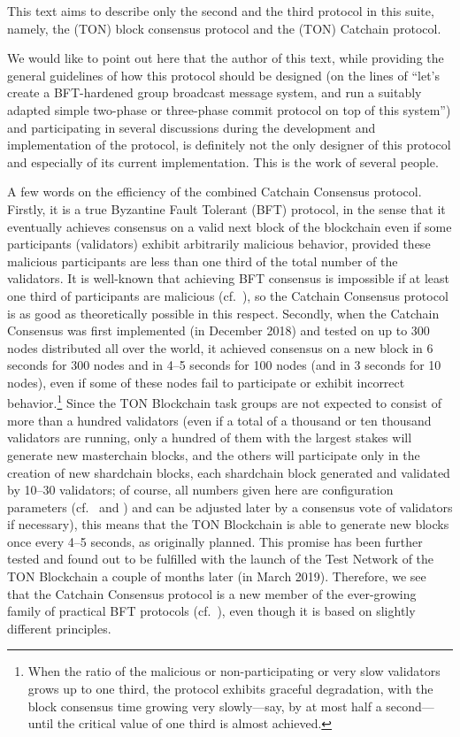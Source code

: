 \documentclass[12pt,oneside]{article}
\begin{document}
This text aims to describe only the second and the third protocol in this suite, namely, the (TON) block consensus protocol and the (TON) Catchain protocol.

We would like to point out here that the author of this text, while providing the general guidelines of how this protocol should be designed (on the lines of ``let's create a BFT-hardened group broadcast message system, and run a suitably adapted simple two-phase or three-phase commit protocol on top of this system'') and participating in several discussions during the development and implementation of the protocol, is definitely not the only designer of this protocol and especially of its current implementation. This is the work of several people.

A few words on the efficiency of the combined Catchain Consensus protocol. Firstly, it is a true Byzantine Fault Tolerant (BFT) protocol, in the sense that it eventually achieves consensus on a valid next block of the blockchain even if some participants (validators) exhibit arbitrarily malicious behavior, provided these malicious participants are less than one third of the total number of the validators. It is well-known that achieving BFT consensus is impossible if at least one third of participants are malicious (cf.~\cite{Byzantine}), so the Catchain Consensus protocol is as good as theoretically possible in this respect. Secondly, when the Catchain Consensus was first implemented (in December 2018) and tested on up to 300 nodes distributed all over the world, it achieved consensus on a new block in 6 seconds for 300 nodes and in 4--5 seconds for 100 nodes (and in 3 seconds for 10 nodes), even if some of these nodes fail to participate or exhibit incorrect behavior.\footnote{When the ratio of the malicious or non-participating or very slow validators grows up to one third, the protocol exhibits graceful degradation, with the block consensus time growing very slowly---say, by at most half a second---until the critical value of one third is almost achieved.} Since the TON Blockchain task groups are not expected to consist of more than a hundred validators (even if a total of a thousand or ten thousand validators are running, only a hundred of them with the largest stakes will generate new masterchain blocks, and the others will participate only in the creation of new shardchain blocks, each shardchain block generated and validated by 10--30 validators; of course, all numbers given here are configuration parameters (cf.\ \cite{TON} and \cite{TBC}) and can be adjusted later by a consensus vote of validators if necessary), this means that the TON Blockchain is able to generate new blocks once every 4--5 seconds, as originally planned. This promise has been further tested and found out to be fulfilled with the launch of the Test Network of the TON Blockchain a couple of months later (in March 2019). Therefore, we see that the Catchain Consensus protocol is a new member of the ever-growing family of practical BFT protocols (cf.~\cite{PBFT}), even though it is based on slightly different principles.
\end{document}
